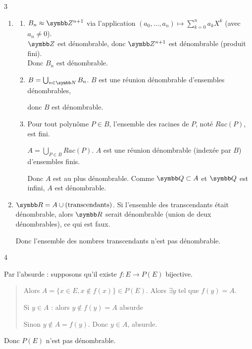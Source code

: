 \begin{correction}{3}
\begin{enumerate}
    \item
    \begin{enumerate}
    \item
        $B_n \approx \Z^{n+1}$ via l'application $(a_0, \dots, a_n) \mapsto \sum_{k=0}^n a_k X^k$ (avec $a_n \neq 0$). \\
        $\Z$ est dénombrable, donc $\Z^{n+1}$ est dénombrable (produit fini). \\
        Donc $B_n$ est dénombrable.

    \item 
        $B = \bigcup_{n \in \N} B_n$.
        $B$ est une réunion dénombrable d'ensembles dénombrables,

        donc $B$ est dénombrable.

    \item 
        Pour tout polynôme $P \in B$, l'ensemble des racines de $P$, noté $Rac(P)$, est fini.

        $A = \bigcup_{P \in B} Rac(P)$.
        $A$ est une réunion dénombrable (indexée par $B$) d'ensembles finis.

        Donc $A$ est au plus dénombrable. Comme $\Q \subset A$ et $\Q$ est infini, $A$ est dénombrable.
    \end{enumerate}

    \item
    $\R = A \cup (\text{transcendants})$.
    Si l'ensemble des transcendants était dénombrable, alors $\R$ serait dénombrable (union de deux dénombrables), ce qui est faux.

    Donc l'ensemble des nombres transcendants n'est pas dénombrable.
\end{enumerate}
\end{correction}

\begin{correction}{4}

    Par l'absurde : supposons qu'il existe $f: E \to P(E)$ bijective.
    \begin{quote}
        Alors $A = \{x \in E, x \not \in f(x)\} \in P(E)$.
        Alors $\exists \! y$ tel que $f(y) = A$.
        
        Si $y \in A$ : alors $y \not \in f(y) = A$ absurde

        Sinon $y \not \in A = f(y)$. Donc $y \in A$, absurde.
    \end{quote}
    Donc $P(E)$ n'est pas dénombrable.
\end{correction}

